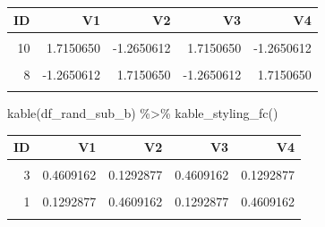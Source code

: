\documentclass[
]{book}
\newenvironment{Shaded}{\begin{snugshade}}{\end{snugshade}}
\newcommand{\FunctionTok}[1]{\textcolor[rgb]{0.00,0.00,0.00}{#1}}
\newcommand{\NormalTok}[1]{#1}
\newcommand{\SpecialCharTok}[1]{\textcolor[rgb]{0.00,0.00,0.00}{#1}}
\begin{document}
\begin{table}[!h]
\centering
\begin{tabular}{r|r|r|r|r}
\hline
ID & V1 & V2 & V3 & V4\\
\hline
\cellcolor{gray!6}{3} & \cellcolor{gray!6}{0.4609162} & \cellcolor{gray!6}{0.1292877} & \cellcolor{gray!6}{0.4609162} & \cellcolor{gray!6}{0.1292877}\\
\hline
10 & 1.7150650 & -1.2650612 & 1.7150650 & -1.2650612\\
\hline
\cellcolor{gray!6}{2} & \cellcolor{gray!6}{1.7150650} & \cellcolor{gray!6}{-1.2650612} & \cellcolor{gray!6}{1.7150650} & \cellcolor{gray!6}{-1.2650612}\\
\hline
8 & -1.2650612 & 1.7150650 & -1.2650612 & 1.7150650\\
\hline
\cellcolor{gray!6}{6} & \cellcolor{gray!6}{1.7150650} & \cellcolor{gray!6}{-1.2650612} & \cellcolor{gray!6}{1.7150650} & \cellcolor{gray!6}{-1.2650612}\\
\hline
\end{tabular}
\end{table}

\begin{Shaded}
\begin{Highlighting}[]
\FunctionTok{kable}\NormalTok{(df\_rand\_sub\_b) }\SpecialCharTok{\%\textgreater{}\%} \FunctionTok{kable\_styling\_fc}\NormalTok{()}
\end{Highlighting}
\end{Shaded}

\begin{table}[!h]
\centering
\begin{tabular}{r|r|r|r|r}
\hline
ID & V1 & V2 & V3 & V4\\
\hline
\cellcolor{gray!6}{5} & \cellcolor{gray!6}{0.1292877} & \cellcolor{gray!6}{0.4609162} & \cellcolor{gray!6}{0.1292877} & \cellcolor{gray!6}{0.4609162}\\
\hline
3 & 0.4609162 & 0.1292877 & 0.4609162 & 0.1292877\\
\hline
\cellcolor{gray!6}{9} & \cellcolor{gray!6}{0.1292877} & \cellcolor{gray!6}{0.4609162} & \cellcolor{gray!6}{0.1292877} & \cellcolor{gray!6}{0.4609162}\\
\hline
1 & 0.1292877 & 0.4609162 & 0.1292877 & 0.4609162\\
\hline
\cellcolor{gray!6}{4} & \cellcolor{gray!6}{-1.2650612} & \cellcolor{gray!6}{1.7150650} & \cellcolor{gray!6}{-1.2650612} & \cellcolor{gray!6}{1.7150650}\\
\hline
\end{tabular}
\end{table}
\end{document}
